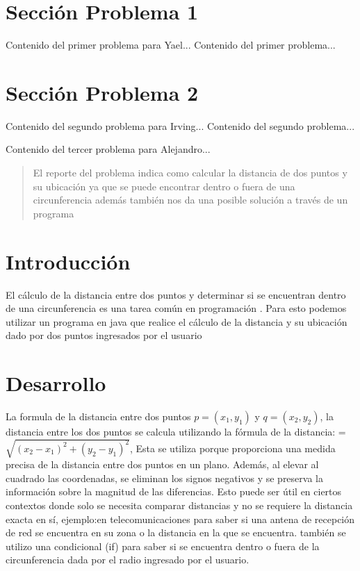\documentclass{IEEEcsmag}
\begin{document}
\section{Sección Problema 1}
Contenido del primer problema para Yael...
\newpage
Contenido del primer problema...
\newpage


\section{Sección Problema 2}
Contenido del segundo problema para Irving...
\newpage
Contenido del segundo problema...
\newpage


Contenido del tercer problema para Alejandro...
\newpage 
\begin{abstract}
    
    El reporte del problema indica como calcular la distancia de dos puntos y su ubicación ya que se puede encontrar dentro o fuera de una circunferencia además también nos da una posible solución a través de un programa 
\end{abstract}


\section{Introducción}
El cálculo de la distancia entre dos puntos y determinar si se encuentran dentro de una circunferencia es una tarea común en programación . Para esto podemos utilizar un programa en java que realice el cálculo de la distancia y su ubicación dado por dos puntos ingresados por el usuario 

\section{Desarrollo}
La formula de la distancia entre dos puntos $p = (x_1, y_1)$ y $q = (x_2, y_2)$, la distancia entre los dos puntos se calcula utilizando la fórmula de la distancia:
 = $\sqrt{{(x_2 - x_1)^2 + (y_2 - y_1)^2}}$,
Esta se utiliza porque proporciona una medida precisa de la distancia entre dos puntos en un plano. Además, al elevar al cuadrado las coordenadas, se eliminan los signos negativos y se preserva la información sobre la magnitud  de las diferencias. Esto puede ser útil en ciertos contextos donde solo se necesita comparar distancias y no se requiere la distancia exacta en sí, ejemplo:en telecomunicaciones para saber si una antena de recepción de red se encuentra en su zona o la distancia en la que se encuentra.
también se utilizo una condicional (if) para saber si se encuentra dentro o fuera de la circunferencia dada por el radio ingresado por el usuario.
\end{document}
